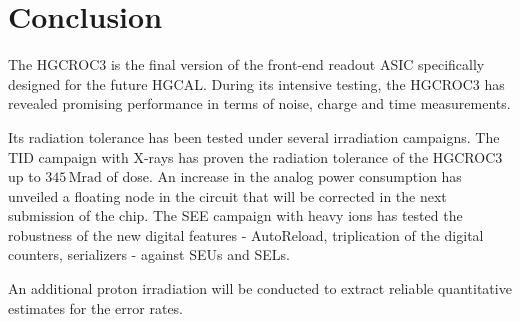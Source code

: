 \section{Conclusion}

The HGCROC3 is the final version of the front-end readout ASIC specifically designed for the future HGCAL. During its intensive testing, the HGCROC3 has revealed promising performance in terms of noise, charge and time measurements.

Its radiation tolerance has been tested under several irradiation campaigns.
The TID campaign with X-rays has proven the radiation tolerance of the HGCROC3 up to $345\,\textrm{Mrad}$ of dose. An increase in the analog power consumption has unveiled a floating node in the circuit that will be corrected in the next submission of the chip.
The SEE campaign with heavy ions has tested the robustness of the new digital features - AutoReload, triplication of the digital counters, serializers - against SEUs and SELs.

An additional proton irradiation will be conducted to extract reliable quantitative estimates for the error rates.